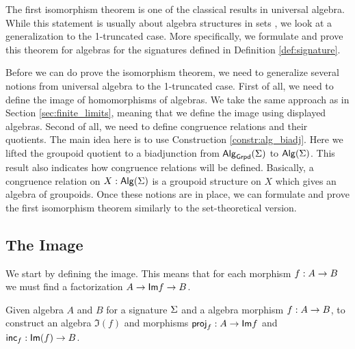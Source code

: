 The first isomorphism theorem is one of the classical results in universal algebra.
While this statement is usually about algebra structures in sets \cite{lynge2019}, we look at a generalization to the 1-truncated case.
More specifically, we formulate and prove this theorem for algebras for the signatures defined in Definition \ref{def:signature}.

Before we can do prove the isomorphism theorem, we need to generalize several notions from universal algebra to the 1-truncated case.
First of all, we need to define the image of homomorphisms of algebras.
We take the same approach as in Section \ref{sec:finite_limits}, meaning that we define the image using displayed algebras.
Second of all, we need to define congruence relations and their quotients.
The main idea here is to use Construction \ref{constr:alg_biadj}.
Here we lifted the groupoid quotient to a biadjunction from $\mathsf{Alg}_{\mathsf{Grpd}}(\Sigma)$ to $\mathsf{Alg}(\Sigma)$.
This result also indicates how congruence relations will be defined.
Basically, a congruence relation on $X : \mathsf{Alg}(\Sigma)$ is a groupoid structure on $X$ which gives an algebra of groupoids.
Once these notions are in place, we can formulate and prove the first isomorphism theorem similarly to the set-theoretical version.

\subsection{The Image}
We start by defining the image.
This means that for each morphism $f : A \rightarrow B$ we must find a factorization $A \rightarrow \mathsf{Im}{f} \rightarrow B$.

\begin{problem}
\label{prob:image}
Given algebra $A$ and $B$ for a signature $\Sigma$ and a algebra morphism $f : A \rightarrow B$,
to construct an algebra $\Im(f)$ and morphisms $\mathsf{proj}_{f} : A \rightarrow \mathsf{Im}{f}$ and $\mathsf{inc}_{f} : \mathsf{Im}(f) \rightarrow B$. 
\end{problem}

